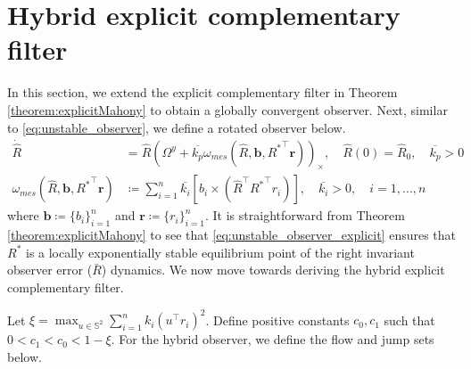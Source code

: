 \documentclass{article}
\newcommand{\SOthree}{\mathbb{SO}(3)}
\newcommand{\R}[1]{\mathbb{R}^{#1}}
\newcommand{\Omegay}{\Omega^y}
\newcommand{\brackets}[1]{\left(#1\right)}
\begin{document}
\section{Hybrid explicit complementary filter}
In this section, we extend the explicit complementary filter in Theorem \ref{theorem:explicitMahony} to obtain a globally convergent observer. Next, similar to \eqref{eq:unstable_observer}, we define a rotated observer below. 
\begin{subequations}\label{eq:unstable_observer_explicit}
\begin{align}
    \dot{\hat{R}} &= \hat{R}\brackets{\Omegay + \overline{k_p}\omega_{mes}(\hat{R}, \mathbf{b}, {R^{*}}^\top \mathbf{r})}_\times,\quad \hat{R}(0) = \hat{R}_0, \quad\overline{k_p}>0\\
    \omega_{mes}(\hat{R}, \mathbf{b}, {R^*}^\top \mathbf{r})&\coloneqq \sum_{i=1}^n \overline{k_i} \left[b_i\times (\hat{R}^\top {R^*}^\top r_i)\right],\quad \overline{k_i}> 0, \quad i=1,..., n
\end{align}
\end{subequations}
where $\mathbf{b}\coloneqq \{b_i\}_{i=1}^n$ and $\mathbf{r}\coloneqq \{r_i\}_{i=1}^n$. It is straightforward from Theorem \ref{theorem:explicitMahony} to see that \eqref{eq:unstable_observer_explicit} ensures that $R^*$ is a locally exponentially stable equilibrium point of the right invariant observer error ($\bar{R}$) dynamics. We now move towards deriving the hybrid explicit complementary filter.  


Let $\xi = \max_{u\in\mathbb{S}^2} \sum_{i=1}^nk_i (u^\top r_i)^2$. Define positive constants $c_0, c_1$ such that $0 < c_1 < c_0 < 1-\xi$. For the hybrid observer, we define the flow and jump sets below. 

\end{document}
